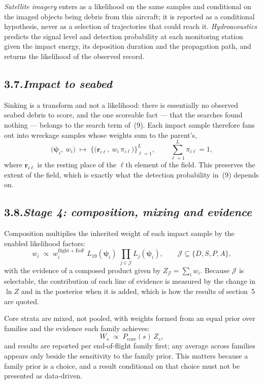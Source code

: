 \documentclass[12pt,a4paper]{article}
\newcommand{\impact}{\boldsymbol{\psi}}
\begin{document}
\emph{Satellite imagery} enters as a likelihood on the same samples and conditional on the
imaged objects being debris from this aircraft; it is reported as a conditional hypothesis, never
as a selection of trajectories that could reach it. \emph{Hydroacoustics} predicts the signal
level and detection probability at each monitoring station given the impact energy, its
deposition duration and the propagation path, and returns the likelihood of the observed record.

\subsection*{3.7.\quad \textit{Impact to seabed}}

Sinking is a transform and not a likelihood: there is essentially no observed seabed debris to
score, and the one scoreable fact --- that the searches found nothing --- belongs to the search
term of~(9). Each impact sample therefore fans out into wreckage samples whose weights sum to
the parent's,
%
\begin{equation}
\bigl(\impact_i,\ w_i\bigr) \;\longmapsto\;
  \bigl\{\bigl(\mathbf{r}_{i\ell},\ w_i\,\pi_{i\ell}\bigr)\bigr\}_{\ell=1}^{L},
  \qquad \sum_{\ell=1}^{L} \pi_{i\ell} = 1,
\end{equation}
%
where $\mathbf{r}_{i\ell}$ is the resting place of the $\ell$th element of the field. This
preserves the extent of the field, which is exactly what the detection probability in~(9)
depends on.

\subsection*{3.8.\quad \textit{Stage 4: composition, mixing and evidence}}

Composition multiplies the inherited weight of each impact sample by the enabled likelihood
factors:
%
\begin{equation}
w_i \;\propto\; w_i^{\mathrm{flight}+\mathrm{EoF}}\;
  L_{19}(\impact_i)\;\prod_{j \in \mathcal{J}} L_j(\impact_i),
  \qquad
  \mathcal{J} \subseteq \{D, S, P, A\},
\end{equation}
%
with the evidence of a composed product given by $Z_{\mathcal{J}} = \sum_i w_i$. Because
$\mathcal{J}$ is selectable, the contribution of each line of evidence is measured by the change
in $\ln Z$ and in the posterior when it is added, which is how the results of section~5 are
quoted.

Core strata are mixed, not pooled, with weights formed from an equal prior over families and the
evidence each family achieves:
%
\begin{equation}
W_s \;\propto\; P_{\mathrm{core}}(s)\, Z_s ,
\end{equation}
%
and results are reported per end-of-flight family first; any average across families appears
only beside the sensitivity to the family prior. This matters because a family prior is a
choice, and a result conditional on that choice must not be presented as data-driven.
\end{document}
